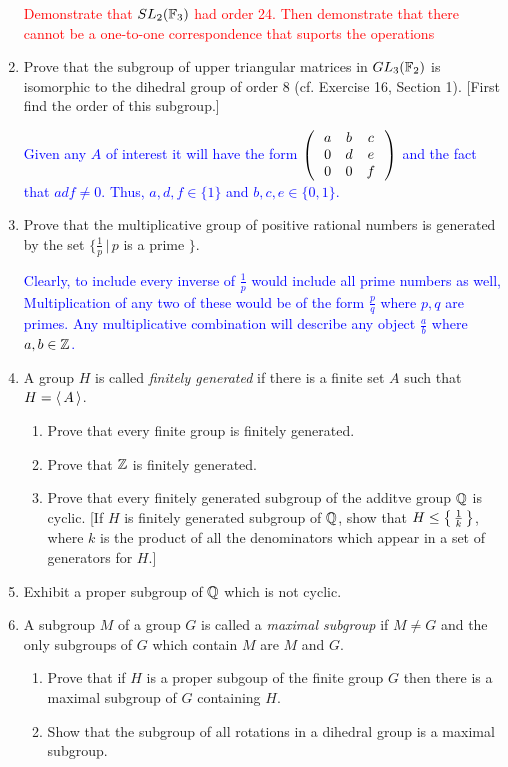 \documentclass[10pt,a4paper]{report}
\newcommand{\RED}[1]{\textcolor{red}{#1}}
\newcommand{\BLUE}[1]{\textcolor{blue}{#1}}
\begin{document}
\begin{enumerate}
\RED{Demonstrate that $SL_2(\mathbb{F}_3)$ had order 24.  Then demonstrate that there cannot be a one-to-one correspondence that suports the operations
}

\item Prove that the subgroup of upper triangular matrices in $GL_3(\mathbb{F}_2)$ is isomorphic to the dihedral group of order 8 (cf. Exercise 16, Section 1).  [First find the order of this subgroup.]

\BLUE{Given any $A$ of interest it will have the form $\left (\,  \begin{array}{c c c} a&b&c \\ 0 & d & e \\ 0 & 0 & f \end{array}  \,\right )$ and the fact that $adf \ne 0$.  Thus, $a,d,f \in \{1\}$ and $b,c,e \in \{0,1\}$.
}

\item Prove that the multiplicative group of positive rational numbers is generated by the set $\{\frac{1}{p}\,|\,p$ is a prime $\}$.

\BLUE{Clearly, to include every inverse of $\frac{1}{p}$ would include all prime numbers as well,  Multiplication of any two of these would be of the form $\frac{p}{q}$ where $p,q$ are primes.  Any multiplicative combination will describe any object $\frac{a}{b}$ where $a,b \in \mathbb{Z}$.
}

\item A group $H$ is called \textit{finitely generated} if there is a finite set $A$ such that $H = \left \langle\, A \,\right \rangle$.
\begin{enumerate}
	\item Prove that every finite group is finitely generated.
	\item Prove that $\mathbb{Z}$ is finitely generated.
	\item Prove that every finitely generated subgroup of the additve group $\mathbb{Q}$ is cyclic. [If $H$ is finitely generated subgroup of $\mathbb{Q}$, show that $H \le \left \{\, \frac{1}{k} \,\right \}$, where $k$ is the product of all the denominators which appear in a set of generators for $H$.]
\end{enumerate}

\item Exhibit a proper subgroup of $\mathbb{Q}$ which is not cyclic.

\item A subgroup $M$ of a group $G$ is called a \textit{maximal subgroup} if $M\ne G$ and the only subgroups of $G$ which contain $M$ are $M$ and $G$.
\begin{enumerate}
	\item Prove that if $H$ is a proper subgoup of the finite group $G$ then there is a maximal subgroup of $G$ containing $H$.
	\item Show that the subgroup of all rotations in a dihedral group is a maximal subgroup.
	

\end{enumerate}
\end{enumerate}
\end{document}
